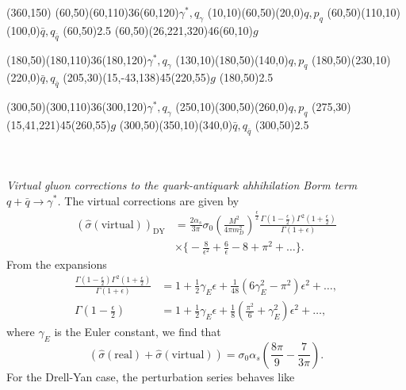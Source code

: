 \begin{axopicture}(360,150) 
	\Photon(60,50)(60,110){3}{6}\Text(60,120){$\gamma^\ast,q_\gamma$}
	\Line[arrow](10,10)(60,50)\Text(20,0){$q,p_q$}
	\Line[arrow](60,50)(110,10)\Text(100,0){$\bar{q},q_{\bar{q}}$}
	\Vertex(60,50){2.5}
	\GluonArc(60,50)(26,221,320){4}{6}\Text(60,10){$g$}
	
	\Photon(180,50)(180,110){3}{6}\Text(180,120){$\gamma^\ast,q_\gamma$}
	\Line[arrow](130,10)(180,50)\Text(140,0){$q,p_q$}
	\Line[arrow](180,50)(230,10)\Text(220,0){$\bar{q},q_{\bar{q}}$}
	\GluonArc(205,30)(15,-43,138){4}{5}\Text(220,55){$g$}
	\Vertex(180,50){2.5}
	
	\Photon(300,50)(300,110){3}{6}\Text(300,120){$\gamma^\ast,q_\gamma$}
	\Line[arrow](250,10)(300,50)\Text(260,0){$q,p_q$}
	\GluonArc(275,30)(15,41,221){4}{5}\Text(260,55){$g$}
	\Line[arrow](300,50)(350,10)\Text(340,0){$\bar{q},q_{\bar{q}}$}
	\Vertex(300,50){2.5}
\end{axopicture}
\\ \\ {\sl Virtual gluon corrections to the quark-antiquark ahhihilation Borm term $q+\bar{q}\to\gamma^\ast$.}
\newline\newline\newline
The virtual corrections are given by
\begin{align}
(\hat{\sigma}(\text{virtual}))_\text{DY}&=\frac{2\alpha_s}{3\pi}\sigma_0\left(\frac{M^2}{4\pi m^2_D}\right)^\frac{\epsilon}{2}\frac{\Gamma(1-\frac{\epsilon}{2})\Gamma^2(1+\frac{\epsilon}{2})}{\Gamma(1+\epsilon)}\nonumber\\
&\times\biggl\{-\frac{8}{\epsilon^2}+\frac{6}{\epsilon}-8+\pi^2+\ldots\biggr\}.
\end{align}
From the expansions
\begin{align}
\frac{\Gamma(1-\frac{\epsilon}{2})\Gamma^2(1+\frac{\epsilon}{2})}{\Gamma(1+\epsilon)}&=1+\frac{1}{2}\gamma_E\epsilon+\frac{1}{48}(6\gamma^2_E-\pi^2)\epsilon^2+\ldots,\nonumber\\
\Gamma\left(1-\frac{\epsilon}{2}\right)&=1+\frac{1}{2}\gamma_E\epsilon+\frac{1}{8}\left(\frac{\pi^2}{6}+\gamma^2_E\right)\epsilon^2+\ldots,
\end{align}
where $\gamma_E$ is the Euler constant, we find that
\begin{equation}
\left(\hat{\sigma}(\text{real})+\hat{\sigma}(\text{virtual})\right)=\sigma_0\alpha_s\left(\frac{8\pi}{9}-\frac{7}{3\pi}\right).
\end{equation}
For the Drell-Yan case, the perturbation series behaves like
